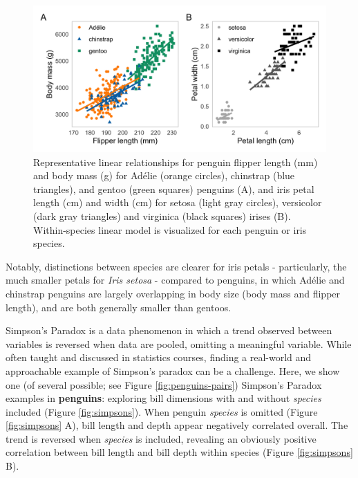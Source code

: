 \begin{Schunk}
\begin{figure}[htbp]

{\centering \includegraphics[width=6in]{fig/linear_example} 

}

\caption[Representative linear relationships for penguin flipper length (mm) and body mass (g) for Adélie (orange circles), chinstrap (blue triangles), and gentoo (green squares) penguins (A), and iris petal length (cm) and width (cm) for setosa (light gray circles), versicolor (dark gray triangles) and virginica (black squares) irises (B)]{Representative linear relationships for penguin flipper length (mm) and body mass (g) for Adélie (orange circles), chinstrap (blue triangles), and gentoo (green squares) penguins (A), and iris petal length (cm) and width (cm) for setosa (light gray circles), versicolor (dark gray triangles) and virginica (black squares) irises (B). Within-species linear model is visualized for each penguin or iris species.}\label{fig:linear-example}
\end{figure}
\end{Schunk}

Notably, distinctions between species are clearer for iris petals -
particularly, the much smaller petals for \emph{Iris setosa} - compared
to penguins, in which Adélie and chinstrap penguins are largely
overlapping in body size (body mass and flipper length), and are both
generally smaller than gentoos.

Simpson's Paradox is a data phenomenon in which a trend observed between
variables is reversed when data are pooled, omitting a meaningful
variable. While often taught and discussed in statistics courses,
finding a real-world and approachable example of Simpson's paradox can
be a challenge. Here, we show one (of several possible; see Figure
\ref{fig:penguins-pairs}) Simpson's Paradox examples in
\textbf{penguins}: exploring bill dimensions with and without
\emph{species} included (Figure \ref{fig:simpsons}). When penguin
\emph{species} is omitted (Figure \ref{fig:simpsons} A), bill length and
depth appear negatively correlated overall. The trend is reversed when
\emph{species} is included, revealing an obviously positive correlation
between bill length and bill depth within species (Figure
\ref{fig:simpsons} B).

